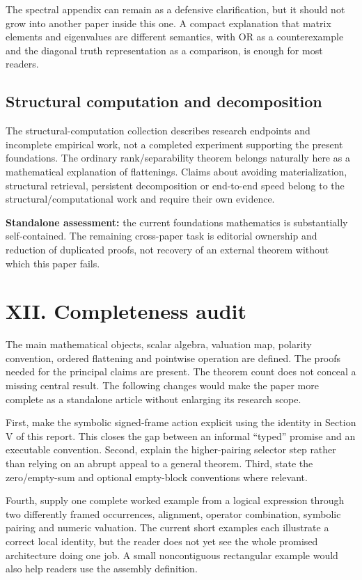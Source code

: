 \documentclass[
  10pt,
]{article}
\begin{document}
The spectral appendix can remain as a defensive clarification, but it
should not grow into another paper inside this one. A compact
explanation that matrix elements and eigenvalues are different
semantics, with OR as a counterexample and the diagonal truth
representation as a comparison, is enough for most readers.

\subsection{Structural computation and
decomposition}\label{structural-computation-and-decomposition}

The structural-computation collection describes research endpoints and
incomplete empirical work, not a completed experiment supporting the
present foundations. The ordinary rank/separability theorem belongs
naturally here as a mathematical explanation of flattenings. Claims
about avoiding materialization, structural retrieval, persistent
decomposition or end-to-end speed belong to the structural/computational
work and require their own evidence.

\textbf{Standalone assessment:} the current foundations mathematics is
substantially self-contained. The remaining cross-paper task is
editorial ownership and reduction of duplicated proofs, not recovery of
an external theorem without which this paper fails.

\section{XII. Completeness audit}\label{xii.-completeness-audit}

The main mathematical objects, scalar algebra, valuation map, polarity
convention, ordered flattening and pointwise operation are defined. The
proofs needed for the principal claims are present. The theorem count
does not conceal a missing central result. The following changes would
make the paper more complete as a standalone article without enlarging
its research scope.

First, make the symbolic signed-frame action explicit using the identity
in Section V of this report. This closes the gap between an informal
``typed'' promise and an executable convention. Second, explain the
higher-pairing selector step rather than relying on an abrupt appeal to
a general theorem. Third, state the zero/empty-sum and optional
empty-block conventions where relevant.

Fourth, supply one complete worked example from a logical expression
through two differently framed occurrences, alignment, operator
combination, symbolic pairing and numeric valuation. The current short
examples each illustrate a correct local identity, but the reader does
not yet see the whole promised architecture doing one job. A small
noncontiguous rectangular example would also help readers use the
assembly definition.
\end{document}
